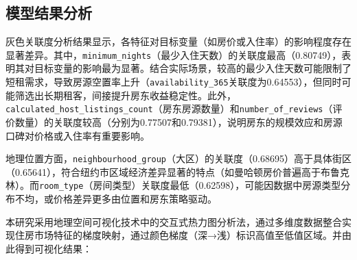 \documentclass[12pt]{article}
\begin{document}
\begin{CJK}{UTF8}{gbsn}
	\subsection{模型结果分析}
	
	灰色关联度分析结果显示，各特征对目标变量（如房价或入住率）的影响程度存在显著差异。其中，\texttt{minimum\_nights}（最少入住天数）的关联度最高（0.80749），表明其对目标变量的影响最为显著。结合实际场景，较高的最少入住天数可能限制了短租需求，导致房源空置率上升（\texttt{availability\_365}关联度为0.64553），但同时可能筛选出长期租客，间接提升房东收益稳定性。此外，\texttt{calculated\_host\_listings\_count}（房东房源数量）和\texttt{number\_of\_reviews}（评价数量）的关联度较高（分别为0.77507和0.79381），说明房东的规模效应和房源口碑对价格或入住率有重要影响。
	
	地理位置方面，\texttt{neighbourhood\_group}（大区）的关联度（0.68695）高于具体街区（0.65641），符合纽约市区域经济差异显著的特点（如曼哈顿房价普遍高于布鲁克林）。而\texttt{room\_type}（房间类型）关联度最低（0.62598），可能因数据中房源类型分布不均，或价格差异更多由位置和房东策略驱动。
	
	本研究采用地理空间可视化技术中的交互式热力图分析法，通过多维度数据整合实现住房市场特征的梯度映射，通过颜色梯度（深→浅）标识高值至低值区域。并由此得到可视化结果：
	

\end{CJK}
\end{document}
